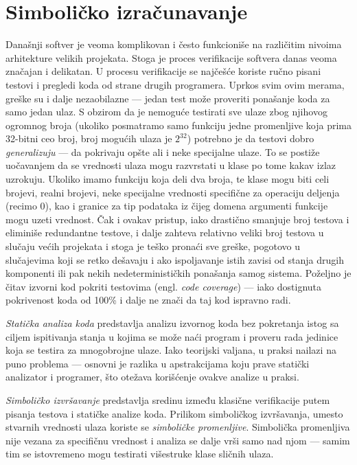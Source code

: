 \chapter{Simboličko izračunavanje}
\label{sec:Symbolics}

Današnji softver je veoma komplikovan i često funkcioniše na različitim nivoima arhitekture velikih projekata. Stoga je proces verifikacije softvera danas veoma značajan i delikatan. U procesu verifikacije se najčešće koriste ručno pisani testovi i pregledi koda od strane drugih programera. Uprkos svim ovim merama, greške su i dalje nezaobilazne --- jedan test može proveriti ponašanje koda za samo jedan ulaz. S obzirom da je nemoguće testirati sve ulaze zbog njihovog ogromnog broja (ukoliko posmatramo samo funkciju jedne promenljive koja prima 32-bitni ceo broj, broj mogućih ulaza je $2^{32}$) potrebno je da testovi dobro \emph{generalizuju} --- da pokrivaju opšte ali i neke specijalne ulaze. To se postiže uočavanjem da se vrednosti ulaza mogu razvrstati u klase po tome kakav izlaz uzrokuju. Ukoliko imamo funkciju koja deli dva broja, te klase mogu biti celi brojevi, realni brojevi, neke specijalne vrednosti specifične za operaciju deljenja (recimo $0$), kao i granice za tip podataka iz čijeg domena argumenti funkcije mogu uzeti vrednost. Čak i ovakav pristup, iako drastično smanjuje broj testova i eliminiše redundantne testove, i dalje zahteva relativno veliki broj testova u slučaju većih projekata i stoga je teško pronaći sve greške, pogotovo u slučajevima koji se retko dešavaju i ako ispoljavanje istih zavisi od stanja drugih komponenti ili pak nekih nedeterminističkih ponašanja samog sistema. Poželjno je čitav izvorni kod pokriti  testovima (engl. \emph{code coverage}) --- iako dostignuta pokrivenost koda od 100\% i dalje ne znači da taj kod ispravno radi.

\emph{Statička analiza koda} predstavlja analizu izvornog koda bez pokretanja istog sa ciljem ispitivanja stanja u kojima se može naći program i proveru rada jedinice koja se testira za mnogobrojne ulaze. Iako teorijski valjana, u praksi nailazi na puno problema --- osnovni je razlika u apstrakcijama koju prave statički analizator i programer, što otežava korišćenje ovakve analize u praksi.

\emph{Simboličko izvršavanje} \cite{SymbolicExecution} predstavlja sredinu između klasične verifikacije putem pisanja testova i statičke analize koda. Prilikom simboličkog izvršavanja, umesto stvarnih vrednosti ulaza koriste se \emph{simboličke promenljive}. Simbolička promenljiva nije vezana za specifičnu vrednost i analiza se dalje vrši samo nad njom --- samim tim se istovremeno mogu testirati višestruke klase sličnih ulaza. 

